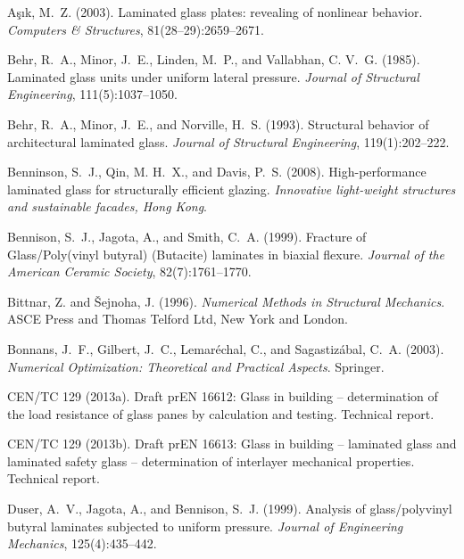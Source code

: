 \documentclass[11pt]{article}
\begin{document}
\begin{thebibliography}{10}

A\c{s}\i{}k, M.~Z. (2003).
Laminated glass plates: revealing of nonlinear behavior.
{\em Computers \& Structures}, 81(28--29):2659--2671.

Behr, R.~A., Minor, J.~E., Linden, M.~P., and Vallabhan, C. V.~G. (1985).
Laminated glass units under uniform lateral pressure.
{\em Journal of Structural Engineering}, 111(5):1037--1050.

Behr, R.~A., Minor, J.~E., and Norville, H.~S. (1993).
Structural behavior of architectural laminated glass.
{\em Journal of Structural Engineering}, 119(1):202--222.

Benninson, S.~J., Qin, M. H.~X., and Davis, P.~S. (2008).
High-performance laminated glass for structurally efficient glazing.
{\em Innovative light-weight structures and sustainable facades, Hong
  Kong}.

Bennison, S.~J., Jagota, A., and Smith, C.~A. (1999).
Fracture of {Glass/Poly(vinyl butyral)
  (Butacite)} laminates in biaxial flexure.
{\em Journal of the American Ceramic Society}, 82(7):1761--1770.

Bittnar, Z. and \v{S}ejnoha, J. (1996).
{\em Numerical Methods in Structural Mechanics}.
ASCE Press and Thomas Telford Ltd, New York and London.

Bonnans, J.~F., Gilbert, J.~C., Lemar\'{e}chal, C., and Sagastiz\'{a}bal, C.~A.
  (2003).
{\em Numerical Optimization: {Theoretical} and Practical Aspects}.
Springer.

{CEN/TC 129} (2013a).
Draft {prEN} 16612: Glass in building -- determination of the load
  resistance of glass panes by calculation and testing.
Technical report.

{CEN/TC 129} (2013b).
Draft {prEN} 16613: Glass in building -- laminated glass and
  laminated safety glass -- determination of interlayer mechanical properties.
Technical report.

Duser, A.~V., Jagota, A., and Bennison, S.~J. (1999).
Analysis of glass/polyvinyl butyral laminates subjected to uniform
  pressure.
{\em Journal of Engineering Mechanics}, 125(4):435--442.


\end{thebibliography}
\end{document}
